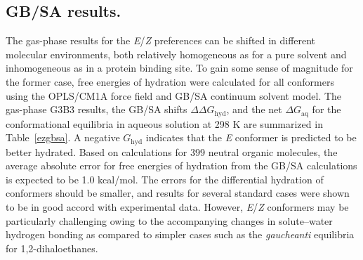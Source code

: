 \documentclass[12pt]{report}
\def\tablab{Table}\def\tabslab{\tablab s}
\newcommand*\tbl[1]{\tablab~\ref{#1}}
\begin{document}
\subsection{GB/SA results.}

The gas-phase results for the \textit{E}/\textit{Z} preferences can be shifted in different molecular environments, both relatively homogeneous as for a pure solvent and inhomogeneous as in a protein binding site. To gain some sense of magnitude for the former case, free energies of hydration were calculated for all conformers using the OPLS/CM1A force field and GB/SA continuum solvent model. \cite{jorg2004,jjez} The gas-phase G3B3 results, the GB/SA shifts $\Delta\Delta G_{\textrm{hyd}}$, and the net $\Delta G_{\textrm{aq}}$ for the conformational equilibria in aqueous solution at 298 K are summarized in \tbl{ezgbsa}. A negative $G_{\textrm{hyd}}$ indicates that the \textit{E} conformer is predicted to be better hydrated. Based on calculations for 399 neutral organic molecules, the average absolute error for free energies of hydration from the GB/SA calculations is expected to be 1.0 kcal/mol.\cite{bashford} The errors for the differential hydration of conformers should be smaller, and results for several standard cases were shown to be in good accord with experimental data.\cite{bashford} However, \textit{E}/\textit{Z} conformers may be particularly challenging owing to the accompanying changes in solute--water hydrogen bonding as compared to simpler cases such as the \textit{gauche}\ce{<=>}\textit{anti} equilibria for 1,2-dihaloethanes.\cite{bashford}
\end{document}
